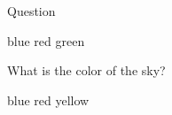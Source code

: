 \documentclass{exam}
\begin{document}
	\begin{mcquestions}
		\question Question
			\begin{mcanswerslist}
				\answer blue
				\answer[correct] red
				\answer green
			\end{mcanswerslist}
		\question What is the color of the sky?
			\begin{mcanswerslist}
				\answer blue
				\answer[correct] red
				\answer yellow
			\end{mcanswerslist}
	\end{mcquestions}
\end{document}
